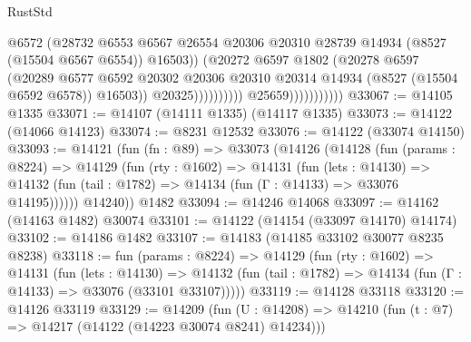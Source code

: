 \begin{lexlean}{RustStd}
\begin{coremodule}
                                              @6572
                                              (@28732
                                                @6553
                                                @6567
                                                @26554
                                                @20306
                                                @20310
                                                @28739
                                                @14934
                                                (@8527 (@15504 @6567 @6554))
                                                @16503))
                                            (@20272
                                              @6597
                                              @1802
                                              (@20278
                                                @6597
                                                (@20289
                                                  @6577
                                                  @6592
                                                  @20302
                                                  @20306
                                                  @20310
                                                  @20314
                                                  @14934
                                                  (@8527 (@15504 @6592 @6578))
                                                  @16503))
                                              @20325))))))))))
                          @25659)))))))))))
@33067 := @14105 @1335
@33071 := @14107 (@14111 @1335) (@14117 @1335)
@33073 := @14122 (@14066 @14123)
@33074 := @8231 @12532
@33076 := @14122 (@33074 @14150)
@33093 := @14121
    (fun (fn : @89) =>
    @33073
      (@14126
        (@14128
          (fun (params : @8224) =>
          @14129
            (fun (rty : @1602) =>
            @14131
              (fun (lets : @14130) =>
              @14132 (fun (tail : @1782) => @14134 (fun (Γ : @14133) => @33076 @14195))))))
        @14240))
    @1482
@33094 := @14246 @14068
@33097 := @14162 (@14163 @1482) @30074
@33101 := @14122 (@14154 (@33097 @14170) @14174)
@33102 := @14186 @1482
@33107 := @14183 (@14185 @33102 @30077 @8235 @8238)
@33118 := fun (params : @8224) =>
  @14129
    (fun (rty : @1602) =>
    @14131
      (fun (lets : @14130) =>
      @14132 (fun (tail : @1782) => @14134 (fun (Γ : @14133) => @33076 (@33101 @33107)))))
@33119 := @14128 @33118
@33120 := @14126 @33119
@33129 := @14209
    (fun (U : @14208) => @14210 (fun (t : @7) => @14217 (@14122 (@14223 @30074 @8241) @14234)))

\end{coremodule}
\end{lexlean}
